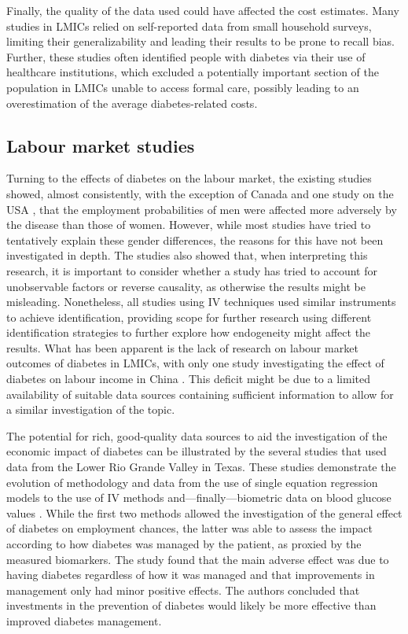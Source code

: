 \documentclass[12pt,english]{article}
\begin{document}
Finally, the quality of the data used could have affected the cost estimates. Many studies in \acp{LMIC} relied on self-reported data from small household surveys, limiting their generalizability and leading their results to be prone to recall bias. Further, these studies often identified people with diabetes via their use of healthcare institutions, which excluded a potentially important section of the population in \acp{LMIC} unable to access formal care, possibly leading to an overestimation of the average diabetes-related costs. 

\subsection{Labour market studies}
Turning to the effects of diabetes on the labour market, the existing studies showed, almost consistently, with the exception of Canada \parencite{Latif2009b} and one study on the USA \parencite{Minor2013}, that the employment probabilities of men were affected more adversely by the disease than those of women. However, while most studies have tried to tentatively explain these gender differences, the reasons for this have not been investigated in depth.  The studies also showed that, when interpreting this research, it is important to consider whether a study has tried to account for unobservable factors or reverse causality, as otherwise the results might be misleading. Nonetheless, all studies using \ac{IV} techniques used similar instruments to achieve identification, providing scope for further research using different identification strategies to further explore how endogeneity might affect the results. What has been apparent is the lack of research on labour market outcomes of diabetes in \acp{LMIC}, with only one study investigating the effect of diabetes on labour income in China \parencite{Liu2014}. This deficit might be due to a limited availability of suitable data sources containing sufficient information to allow for a similar investigation of the topic.

The potential for rich, good-quality data sources to aid the investigation of the economic impact of diabetes can be illustrated by the several studies that used data from the Lower Rio Grande Valley in Texas. These studies demonstrate the evolution of methodology and data from the use of single equation regression models \parencite{Bastida2002} to the use of \ac{IV} methods \parencite{Brown2005d} and---finally---biometric data on blood glucose values \parencite{BrownIII2011}. While the first two methods allowed the investigation of the general effect of diabetes on employment chances, the latter was able to assess the impact according to how diabetes was managed by the patient, as proxied by the measured biomarkers. The study found that the main adverse effect was due to having diabetes regardless of how it was managed and that improvements in management only had minor positive effects. The authors concluded that investments in the prevention of diabetes would likely be more effective than improved diabetes management.
\end{document}
